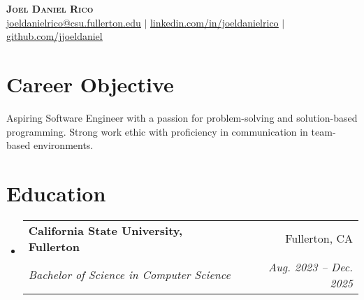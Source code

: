 \documentclass[letterpaper,11pt]{article}
\makeatletter
\newcommand{\resumeSubheading}[4]{
  \vspace{-2pt}\item
    \begin{tabular*}{0.97\textwidth}[t]{l@{\extracolsep{\fill}}r}
      \textbf{#1} & #2 \\
      \textit{\small#3} & \textit{\small #4} \\
    \end{tabular*}\vspace{-7pt}
}
\newcommand{\resumeSubHeadingListStart}{\begin{itemize}[leftmargin=0.15in, label={}]}
\newcommand{\resumeSubHeadingListEnd}{\end{itemize}}
\makeatother
\begin{document}
\begin{center}
    \textbf{\Huge \scshape Joel Daniel Rico} \\ \vspace{1pt}
    \small \href{mailto:joeldanielrico@csu.fullerton.edu.com}{\underline{joeldanielrico@csu.fullerton.edu}} $|$ 
    \href{https://linkedin.com/in/joeldanielrico}{\underline{linkedin.com/in/joeldanielrico}} $|$
    \href{https://github.com/jjoeldaniel}{\underline{github.com/jjoeldaniel }}
\end{center}


\section{Career Objective}
  Aspiring Software Engineer with a passion for problem-solving and solution-based programming. Strong
  work ethic with proficiency in communication in team-based environments.



\section{Education}
  \resumeSubHeadingListStart
    \resumeSubheading
      {California State University, Fullerton}{Fullerton, CA}
      {Bachelor of Science in Computer Science}{Aug. 2023 -- Dec. 2025}
  \resumeSubHeadingListEnd


\end{document}
